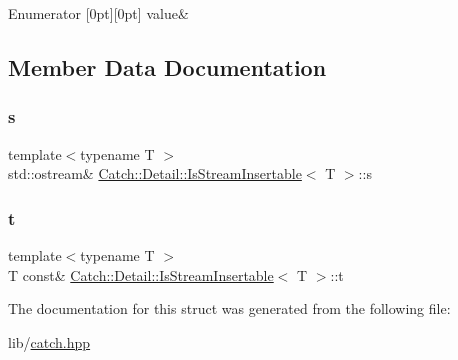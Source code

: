 \begin{DoxyEnumFields}{Enumerator}
[0pt][0pt]{}\hypertarget{struct_catch_1_1_detail_1_1_is_stream_insertable_a2e4508694da3bf368ff67733a7970edda765a324929702bfce2969fc19fc4f926}{}\label{struct_catch_1_1_detail_1_1_is_stream_insertable_a2e4508694da3bf368ff67733a7970edda765a324929702bfce2969fc19fc4f926} 
value&\\
\hline

\end{DoxyEnumFields}


\subsection{Member Data Documentation}
\hypertarget{struct_catch_1_1_detail_1_1_is_stream_insertable_abe3d3c8e5d85665747faafffc9a96b00}{}\label{struct_catch_1_1_detail_1_1_is_stream_insertable_abe3d3c8e5d85665747faafffc9a96b00} 
\subsubsection{\texorpdfstring{s}{s}}
{\footnotesize\ttfamily template$<$typename T $>$ \\
std\+::ostream\& \hyperlink{struct_catch_1_1_detail_1_1_is_stream_insertable}{Catch\+::\+Detail\+::\+Is\+Stream\+Insertable}$<$ T $>$\+::s\hspace{0.3cm}{\ttfamily [static]}}

\hypertarget{struct_catch_1_1_detail_1_1_is_stream_insertable_a7d2a3da978b6736667a7b2f6d51f507f}{}\label{struct_catch_1_1_detail_1_1_is_stream_insertable_a7d2a3da978b6736667a7b2f6d51f507f} 
\subsubsection{\texorpdfstring{t}{t}}
{\footnotesize\ttfamily template$<$typename T $>$ \\
T const\& \hyperlink{struct_catch_1_1_detail_1_1_is_stream_insertable}{Catch\+::\+Detail\+::\+Is\+Stream\+Insertable}$<$ T $>$\+::t\hspace{0.3cm}{\ttfamily [static]}}



The documentation for this struct was generated from the following file\+:\begin{DoxyCompactItemize}
\item 
lib/\hyperlink{catch_8hpp}{catch.\+hpp}\end{DoxyCompactItemize}
